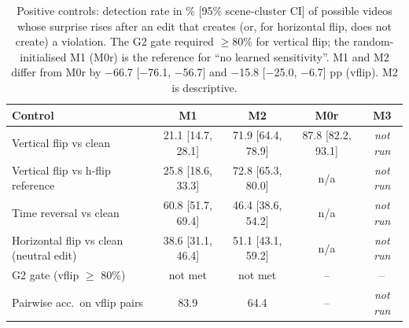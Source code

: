 \begin{table}[t]
\caption{Positive controls: detection rate in \% [95\% scene-cluster CI] of possible videos whose surprise rises after an edit that creates (or, for horizontal flip, does not create) a violation. The G2 gate required $\geq$80\% for vertical flip; the random-initialised M1 (M0r) is the reference for ``no learned sensitivity''. M1 and M2 differ from M0r by $-$66.7 [$-$76.1, $-$56.7] and $-$15.8 [$-$25.0, $-$6.7] pp (vflip). M2 is descriptive.}
\label{tab:t3}
\centering\scriptsize
\setlength{\tabcolsep}{4pt}
\begin{tabular}{@{}lcccc@{}}
\toprule
Control & M1 & M2 & M0r & M3 \\
\midrule
Vertical flip vs clean & 21.1 [14.7, 28.1] & 71.9 [64.4, 78.9] & 87.8 [82.2, 93.1] & \textit{not run} \\
Vertical flip vs h-flip reference & 25.8 [18.6, 33.3] & 72.8 [65.3, 80.0] & n/a & \textit{not run} \\
Time reversal vs clean & 60.8 [51.7, 69.4] & 46.4 [38.6, 54.2] & n/a & \textit{not run} \\
Horizontal flip vs clean (neutral edit) & 38.6 [31.1, 46.4] & 51.1 [43.1, 59.2] & n/a & \textit{not run} \\
\midrule
G2 gate (vflip $\geq$ 80\%) & not met & not met & -- & -- \\
Pairwise acc.\ on vflip pairs & 83.9 & 64.4 & -- & \textit{not run} \\
\bottomrule
\end{tabular}
\end{table}
